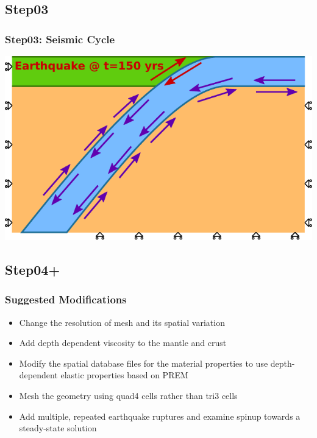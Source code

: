 \documentclass{beamer}
\begin{document}
\subsection{Step03}

\begin{frame}
  \frametitle{Step03: Seismic Cycle}
 
  \begin{center}
    \includegraphics[scale=1.0]{figs/diagram_step03}
  \end{center}

\end{frame}


\subsection{Step04+}

\begin{frame}
  \frametitle{Suggested Modifications}
 
  \begin{itemize}
  \item Change the resolution of mesh and its spatial variation
  \item Add depth dependent viscosity to the mantle and crust
  \item Modify the spatial database files for the material properties
    to use depth-dependent elastic properties based on PREM
  \item Mesh the geometry using quad4 cells rather than tri3 cells
  \item Add multiple, repeated earthquake ruptures and examine spinup
    towards a steady-state solution
  \end{itemize}

\end{frame}


\end{document}
